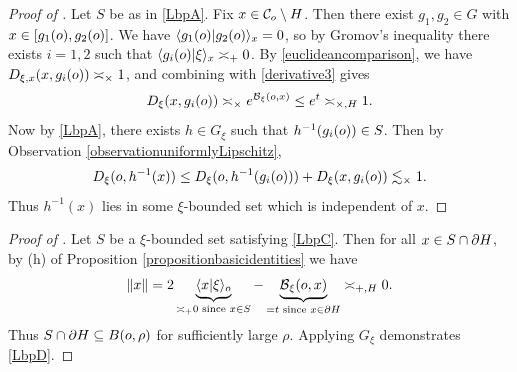 \begin{proof}[Proof of  \implies {}]
Let $S$ be as in \eqref{LbpA}. Fix $x\in\mathcal C_o \setminus H$. Then there exist $g_1,g_2\in G$ with $x\in[g_1(o),g_2(o)]$. We have $\langle g_1(o) | g_2(o) \rangle_x = 0$, so by Gromov's inequality there exists $i = 1,2$ such that $\langle g_i(o) | \xi \rangle_x \asymp_+ 0$. By \eqref{euclideancomparison}, we have $D_{\xi,x}(x,g_i(o)) \asymp_\times 1$, and combining with \eqref{derivative3} gives
\[
D_\xi(x,g_i(o)) \asymp_\times e^{\operatorname{\mathcal B}_\xi(o,x)} \leq e^t \asymp_{\times,H} 1.
\]
Now by \eqref{LbpA}, there exists $h\in G_\xi$ such that $h^{-1}(g_i(o))\in S$. Then by Observation \ref{observationuniformlyLipschitz},
\[
D_\xi(o,h^{-1}(x)) \leq D_\xi(o,h^{-1}(g_i(o))) + D_\xi(x,g_i(o)) \lesssim_\times 1.
\]
Thus $h^{-1}(x)$ lies in some $\xi$-bounded set which is independent of $x$.
\end{proof}
\begin{proof}[Proof of  \implies {}]
Let $S$ be a $\xi$-bounded set satisfying \eqref{LbpC}. Then for all $x\in S\cap\partial H$, by (h) of Proposition \ref{propositionbasicidentities} we have
\[
\|x\| = 2\underbrace{\langle x|\xi\rangle_o}_{\asymp_+ 0 \textup{ since }x\in S} - \underbrace{\operatorname{\mathcal B}_\xi(o,x)}_{ = t \textup{ since }x\in\partial H} \asymp_{+,H} 0.
\]
Thus $S\cap\partial H\subseteq B(o,\rho)$ for sufficiently large $\rho$. Applying $G_\xi$ demonstrates \eqref{LbpD}.
\end{proof}
